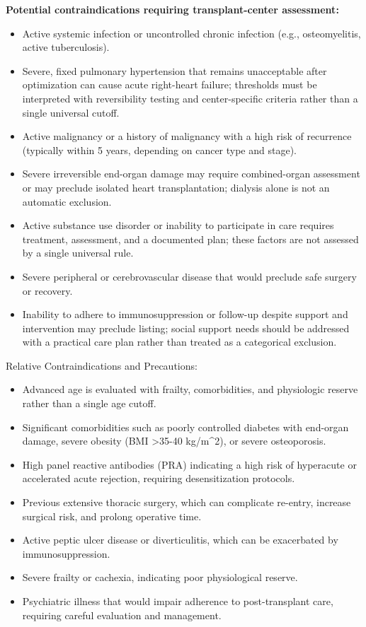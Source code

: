 \textbf{Potential contraindications requiring transplant-center assessment:}

\begin{itemize}
  \item Active systemic infection or uncontrolled chronic infection (e.g., osteomyelitis, active tuberculosis).
  \item Severe, fixed pulmonary hypertension that remains unacceptable after optimization can cause acute right-heart failure; thresholds must be interpreted with reversibility testing and center-specific criteria rather than a single universal cutoff.
  \item Active malignancy or a history of malignancy with a high risk of recurrence (typically within 5 years, depending on cancer type and stage).
  \item Severe irreversible end-organ damage may require combined-organ assessment or may preclude isolated heart transplantation; dialysis alone is not an automatic exclusion.
  \item Active substance use disorder or inability to participate in care requires treatment, assessment, and a documented plan; these factors are not assessed by a single universal rule.
  \item Severe peripheral or cerebrovascular disease that would preclude safe surgery or recovery.
  \item Inability to adhere to immunosuppression or follow-up despite support and intervention may preclude listing; social support needs should be addressed with a practical care plan rather than treated as a categorical exclusion.
\end{itemize}

Relative Contraindications and Precautions:

\begin{itemize}
  \item Advanced age is evaluated with frailty, comorbidities, and physiologic reserve rather than a single age cutoff.
  \item Significant comorbidities such as poorly controlled diabetes with end-organ damage, severe obesity (BMI >35-40 kg/m\textasciicircum2), or severe osteoporosis.
  \item High panel reactive antibodies (PRA) indicating a high risk of hyperacute or accelerated acute rejection, requiring desensitization protocols.
  \item Previous extensive thoracic surgery, which can complicate re-entry, increase surgical risk, and prolong operative time.
  \item Active peptic ulcer disease or diverticulitis, which can be exacerbated by immunosuppression.
  \item Severe frailty or cachexia, indicating poor physiological reserve.
  \item Psychiatric illness that would impair adherence to post-transplant care, requiring careful evaluation and management.
\end{itemize}

